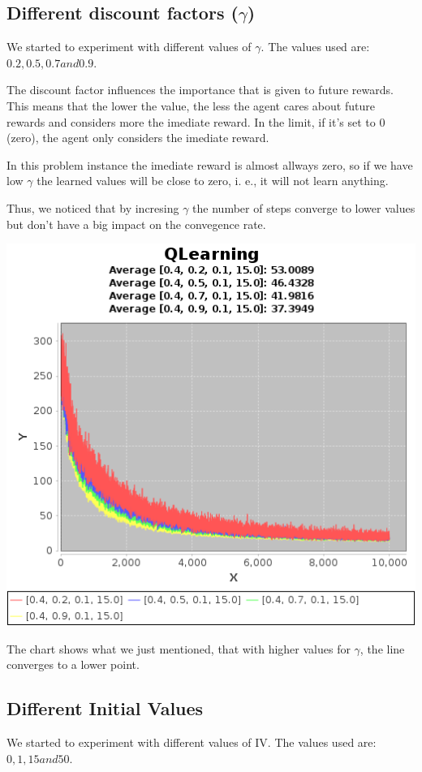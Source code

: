 \documentclass{article}
\begin{document}
\subsection{Different discount factors ($\gamma$)}
We started to experiment with different values of $\gamma$. The values used are:
$0.2, 0.5, 0.7 and 0.9$. 

The discount factor influences the importance that is given to future rewards.
This means that the lower the value, the less the agent cares about future
rewards and considers more the imediate reward. In the limit, if it's set to
$0$ (zero), the agent only considers the imediate reward.

In this problem instance the imediate reward is almost allways zero, so if we
have low $\gamma$ the learned values will be close to zero, i. e., it will not
learn anything. 

Thus, we noticed that by incresing $\gamma$ the number of steps converge to
lower values but don't have a big impact on the convegence rate.

\includegraphics[]{res/alpha_04_gama_02_to_09_epsilon_01_IV_15.png}

The chart shows what we just mentioned, that with higher values for $\gamma$,
the line converges to a lower point.

\subsection{Different Initial Values}
We started to experiment with different values of IV. The values used are:
$0, 1, 15 and 50$. 
\end{document}
